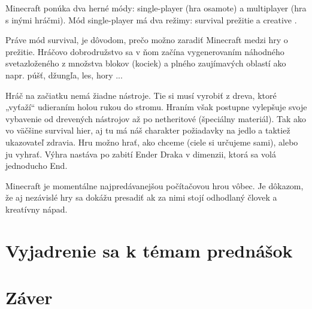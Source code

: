 \documentclass[10pt,oneoside,slovak,a4paper]{article}
\begin{document}
Minecraft ponúka dva herné módy: single-player (hra osamote) a multiplayer (hra s inými hráčmi).
Mód single-player má dva režimy: survival prežitie a creative .

Práve mód survival, je dôvodom, prečo možno zaradiť Minecraft medzi hry o prežitie.
Hráčovo dobrodružstvo sa v ňom začína vygenerovaním náhodného sveta\cite{Duncan}zloženého z množstva blokov (kociek) a plného zaujímavých oblastí ako napr. púšť, džungľa, les, hory ...

Hráč na začiatku  nemá žiadne nástroje. Tie si musí vyrobiť z dreva, ktoré „vyťaží“ udieraním holou rukou do stromu\cite{RB}. Hraním však postupne vylepšuje svoje vybavenie od drevených nástrojov až po netheritové (špeciálny materiál). Tak ako vo väčšine survival hier, aj tu má náš charakter požiadavky na jedlo a taktiež ukazovateľ zdravia. 
Hru možno hrať, ako chceme (ciele si určujeme sami), alebo ju vyhrať. Výhra nastáva po zabití Ender Draka v dimenzii, ktorá sa volá jednoducho End.

Minecraft je momentálne najpredávanejšou počítačovou hrou vôbec.  Je dôkazom, že aj nezávislé hry sa dokážu presadiť ak za nimi stojí odhodlaný človek a kreatívny nápad.



\section{Vyjadrenie sa k témam prednášok} 


\section{Záver} \label{zaver} %




\newpage

\end{document}
